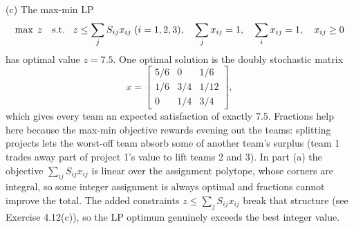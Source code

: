 (c) The max-min LP
\[
\max \; z \quad \text{s.t.}\;\; \; z \leq \sum_j S_{ij} x_{ij} \; (i = 1,2,3), \quad \sum_j x_{ij} = 1, \quad \sum_i x_{ij} = 1, \quad x_{ij} \geq 0
\]
has optimal value $z = 7.5$. One optimal solution is the doubly stochastic matrix
\[
x = \begin{bmatrix} 5/6 & 0 & 1/6 \\ 1/6 & 3/4 & 1/12 \\ 0 & 1/4 & 3/4 \end{bmatrix},
\]
which gives every team an expected satisfaction of exactly $7.5$. Fractions help here because the max-min objective rewards evening out the teams: splitting projects lets the worst-off team absorb some of another team's surplus (team 1 trades away part of project 1's value to lift teams 2 and 3). In part (a) the objective $\sum_{ij} S_{ij} x_{ij}$ is linear over the assignment polytope, whose corners are integral, so some integer assignment is always optimal and fractions cannot improve the total. The added constraints $z \leq \sum_j S_{ij} x_{ij}$ break that structure (see Exercise 4.12(c)), so the LP optimum genuinely exceeds the best integer value.

